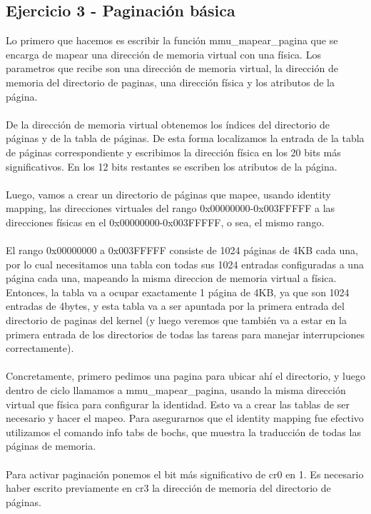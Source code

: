 \documentclass[10pt,a4paper,spanish]{article}
\begin{document}
\subsection{Ejercicio 3 - Paginación básica}
Lo primero que hacemos es escribir la función mmu\_mapear\_pagina que se encarga de mapear una dirección de memoria virtual con una física. Los parametros que recibe son una dirección de memoria virtual, la dirección de memoria del directorio de paginas, una dirección física y los atributos de la página.
\\ \\
De la dirección de memoria virtual obtenemos los índices del directorio de páginas y de la tabla de páginas. De esta forma localizamos la entrada de la tabla de páginas correspondiente y escribimos la dirección física en los 20 bits más significativos. En los 12 bits restantes se escriben los atributos de la página.
\\ \\
Luego, vamos a crear un directorio de páginas que mapee, usando identity mapping, las direcciones virtuales del rango 0x00000000-0x003FFFFF a las direcciones físicas en el 0x00000000-0x003FFFFF, o sea, el mismo rango.
\\ \\
El rango 0x00000000 a 0x003FFFFF consiste de 1024 páginas de 4KB cada una, por lo cual necesitamos una tabla con todas sus 1024 entradas configuradas a una página cada una, mapeando la misma direccion de memoria virtual a física. Entonces, la tabla va a ocupar exactamente 1 página de 4KB, ya que son 1024 entradas de 4bytes, y esta tabla va a ser apuntada por la primera entrada del directorio de paginas del kernel (y luego veremos que también va a estar en la primera entrada de los directorios de todas las tareas para manejar interrupciones correctamente).
\\ \\
Concretamente, primero pedimos una pagina para ubicar ahí el directorio, y luego dentro de ciclo llamamos a mmu\_mapear\_pagina, usando la misma dirección virtual que física para configurar la identidad. Esto va a crear las tablas de ser necesario y hacer el mapeo.
Para asegurarnos que el identity mapping fue efectivo utilizamos el comando info tabs de bochs, que muestra la traducción de todas las páginas de memoria.
\\ \\
Para activar paginación ponemos el bit más significativo de cr0 en 1. Es necesario haber escrito previamente en cr3 la dirección de memoria del directorio de páginas.
\end{document}
